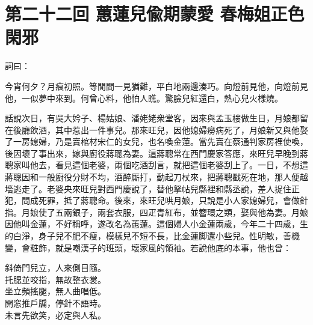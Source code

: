 
\chapter*{第二十二回 蕙蓮兒偸期蒙愛 春梅姐正色閑邪}


詞曰：

\begin{myquote} 
今宵何夕？月痕初照。等閒間一見猶難，平白地兩邊湊巧。向燈前見他，向燈前見他，一似夢中來到。何曾心料，他怕人瞧。驚臉兒紅還白，熱心兒火樣燒。

\end{myquote} 

話說次日，有吳大妗子、楊姑娘、潘姥姥衆堂客，因來與孟玉樓做生日，月娘都留在後廳飲酒，其中惹出一件事兒。那來旺兒，因他媳婦癆病死了，月娘新又與他娶了一房媳婦，乃是賣棺材宋仁的女兒，也名喚金蓮。{}當先賣在蔡通判家房裡使喚，後因壞了事出來，嫁與廚役蔣聰為妻。這蔣聰常在西門慶家答應，來旺兒早晚到蔣聰家叫他去，看見這個老婆，兩個吃酒刮言，就把這個老婆刮上了。一日，不想這蔣聰因和一般廚役分財不均，酒醉厮打，動起刀杖來，把蔣聰戳死在地，那人便越墻逃走了。老婆央來旺兒對西門慶說了，替他拏帖兒縣裡和縣丞說，差人捉住正犯，問成死罪，抵了蔣聰命。{}後來，來旺兒哄月娘，只說是小人家媳婦兒，會做針指。月娘使了五兩銀子，兩套衣服，四疋青紅布，並簪環之類，娶與他為妻。月娘因他叫金蓮，不好稱呼，遂改名為蕙蓮。這個婦人小金蓮兩歲，今年二十四歲，生的白淨，身子兒不肥不瘦，模樣兒不短不長，比金蓮脚還小些兒。性明敏，善機變，會粧飾，{}就是嘲漢子的班頭，壞家風的領袖。若說他底的本事，他也曾：

\begin{myquote} 
斜倚門兒立，人來側目隨。\\托腮並咬指，無故整衣裳。\\坐立頻搖腿，無人曲唱低。\\開窓推戶牖，停針不語時。{}\\未言先欲笑，必定與人私。
\end{myquote} 

